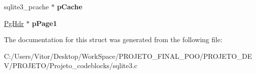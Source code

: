 \begin{DoxyCompactItemize}
\item 
\hypertarget{struct_p_cache_ad0248655d30d327e0eeced6c3651b161}{sqlite3\-\_\-pcache $\ast$ {\bfseries p\-Cache}}\label{struct_p_cache_ad0248655d30d327e0eeced6c3651b161}

\item 
\hypertarget{struct_p_cache_a190ece57aafde4310e424f82998776cb}{\hyperlink{struct_pg_hdr}{Pg\-Hdr} $\ast$ {\bfseries p\-Page1}}\label{struct_p_cache_a190ece57aafde4310e424f82998776cb}

\end{DoxyCompactItemize}


The documentation for this struct was generated from the following file\-:\begin{DoxyCompactItemize}
\item 
C\-:/\-Users/\-Vitor/\-Desktop/\-Work\-Space/\-P\-R\-O\-J\-E\-T\-O\-\_\-\-F\-I\-N\-A\-L\-\_\-\-P\-O\-O/\-P\-R\-O\-J\-E\-T\-O\-\_\-\-D\-E\-V/\-P\-R\-O\-J\-E\-T\-O/\-Projeto\-\_\-codeblocks/sqlite3.\-c\end{DoxyCompactItemize}
